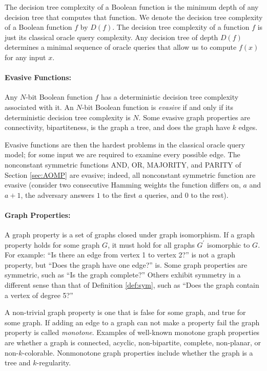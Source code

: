 \label{subs:ddtc}

The decision tree complexity of a Boolean function is the minimum
depth of any decision tree that computes that function.  We denote the
decision tree complexity of a Boolean function $f$ by $D(f)$.  The
decision tree complexity of a function $f$ is just its classical
oracle query complexity.  Any decision tree of depth $D(f)$ determines
a minimal sequence of oracle queries that allow us to compute $f(x)$
for any input $x$.

\paragraph{Evasive Functions:}
\label{sec:ef}
Any $N$-bit Boolean function $f$ has a deterministic decision tree
complexity associated with it.  An $N$-bit Boolean function is
\emph{evasive} if and only if its deterministic decision tree
complexity is $N$.  Some evasive graph properties are connectivity,
bipartiteness, is the graph a tree, and does the graph have $k$ edges.

Evasive functions are then the hardest problems in the classical
oracle query model; for some input we are required to examine every
possible edge.  The nonconstant symmetric functions AND, OR, MAJORITY,
and PARITY of Section \ref{sec:AOMP} are evasive; indeed, all
nonconstant symmetric function are evasive (consider two consecutive
Hamming weights the function differs on, $a$ and $a+1$, the adversary
answers $1$ to the first $a$ queries, and $0$ to the rest).

\paragraph{Graph Properties:}
\label{sec:gp}
A graph property is a set of graphs closed under graph isomorphism.
If a graph property holds for some graph $G$, it must hold for all
graphs $G^{\prime}$ isomorphic to $G$.  For example: ``Is there an
edge from vertex 1 to vertex 2?'' is not a graph property, but ``Does
the graph have one edge?'' is.  Some graph properties are symmetric,
such as ``Is the graph complete?''  Others exhibit symmetry in a
different sense than that of Definition \ref{def:sym}, such as ``Does
the graph contain a vertex of degree 5?''

A non-trivial graph property is one that is false for some graph, and
true for some graph.  If adding an edge to a graph can not make a
property fail the graph property is called \emph{monotone}.  Examples
of well-known monotone graph properties are whether a graph is
connected, acyclic, non-bipartite, complete, non-planar, or
non-$k$-colorable.  Nonmonotone graph properties include whether the
graph is a tree and $k$-regularity.

